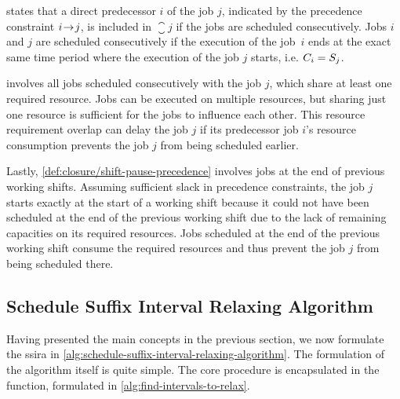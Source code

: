  states that a direct predecessor $i$ of the job $j$,
indicated by the precedence constraint $i \hspace{-0.2em} \rightarrow \hspace{-0.2em} j$,
is included in $\closure{j}$ if the jobs are scheduled consecutively.
Jobs $i$ and $j$ are scheduled consecutively if the execution of the job~$i$ ends
at the exact same time period where the execution of the job $j$ starts,
i.e. $C_{i} = S_{j}$.

 involves all jobs scheduled consecutively with the job $j$,
which share at least one required resource.
Jobs can be executed on multiple resources,
but sharing just one resource is sufficient for the jobs to influence each other.
This resource requirement overlap can delay the job $j$ if its predecessor job $i$'s resource consumption
prevents the job $j$ from being scheduled earlier.

Lastly, \cref{def:closure/shift-pause-precedence} involves jobs at the end of previous working shifts.
Assuming sufficient slack in precedence constraints,
the job $j$ starts exactly at the start of a working shift because
it could not have been scheduled at the end of the previous working shift
due to the lack of remaining capacities on its required resources.
Jobs scheduled at the end of the previous working shift consume the required resources
and thus prevent the job $j$ from being scheduled there.

\subsection{Schedule Suffix Interval Relaxing Algorithm} \label{subsec:extended-solution/schedule-suffix-interal-relaxing-algorithm}

Having presented the main concepts in the previous section,
we now formulate the \acf{ssira} in \cref{alg:schedule-suffix-interval-relaxing-algorithm}.
The formulation of the algorithm itself is quite simple.
The core procedure is encapsulated in the
 function,
formulated in \cref{alg:find-intervals-to-relax}.


